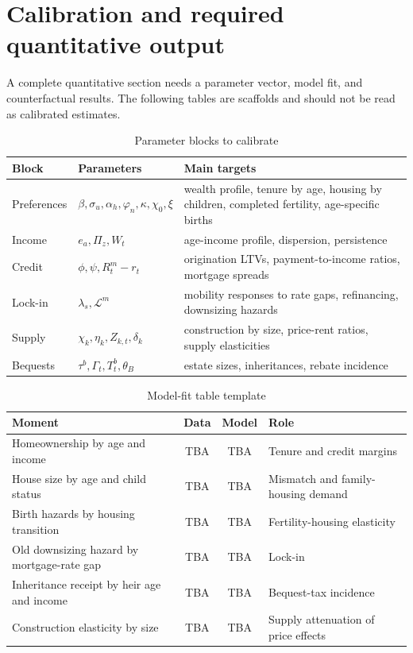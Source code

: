 \documentclass[11pt]{article}
\newcommand{\1}{\mathbf 1}
\begin{document}
\section{Calibration and required quantitative output}

A complete quantitative section needs a parameter vector, model fit, and counterfactual results. The following tables are scaffolds and should not be read as calibrated estimates.

\begin{table}[H]
\centering
\caption{Parameter blocks to calibrate}
\small
\begin{tabularx}{\textwidth}{@{}l l X@{}}
\toprule
Block & Parameters & Main targets \\
\midrule
Preferences & $\beta,\sigma_u,\alpha_h,\varphi_n,\kappa,\chi_0,\xi$ & wealth profile, tenure by age, housing by children, completed fertility, age-specific births \\
Income & $e_a,\Pi_z,W_t$ & age-income profile, dispersion, persistence \\
Credit & $\phi,\psi,R_t^m-r_t$ & origination LTVs, payment-to-income ratios, mortgage spreads \\
Lock-in & $\lambda_s,\mathcal L^m$ & mobility responses to rate gaps, refinancing, downsizing hazards \\
Supply & $\chi_k,\eta_k,Z_{k,t},\delta_k$ & construction by size, price-rent ratios, supply elasticities \\
Bequests & $\tau^b,\Gamma_t,T_t^b,\theta_B$ & estate sizes, inheritances, rebate incidence \\
\bottomrule
\end{tabularx}
\end{table}

\begin{table}[H]
\centering
\caption{Model-fit table template}
\small
\begin{tabularx}{\textwidth}{@{}X c c X@{}}
\toprule
Moment & Data & Model & Role \\
\midrule
Homeownership by age and income & TBA & TBA & Tenure and credit margins \\
House size by age and child status & TBA & TBA & Mismatch and family-housing demand \\
Birth hazards by housing transition & TBA & TBA & Fertility-housing elasticity \\
Old downsizing hazard by mortgage-rate gap & TBA & TBA & Lock-in \\
Inheritance receipt by heir age and income & TBA & TBA & Bequest-tax incidence \\
Construction elasticity by size & TBA & TBA & Supply attenuation of price effects \\
\bottomrule
\end{tabularx}
\end{table}
\end{document}
